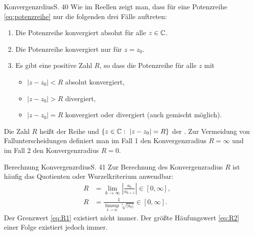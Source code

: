 \begin{bemerkung}{Konvergenzrdius}{S. 40}
  Wie im Reellen zeigt man, dass für eine Potenzreihe \eqref{eq:potenzreihe} nur die folgenden drei Fälle auftreten:
  \begin{enumerate}
    \item Die Potenzreihe konvergiert absolut für alle $z \in \mathbb{C}$.
    \item Die Potenzreihe konvergiert nur für $z = z_0$.
    \item Es gibt eine positive Zahl $R$, so dass die Potenzreihe für alle $z$ mit
      \begin{itemize}
        \item $|z - z_0| < R$ absolut konvergiert,
        \item $|z - z_0| > R$ divergiert,
        \item $|z - z_0| = R$ konvergiert oder divergiert (auch gemischt möglich).
      \end{itemize}
  \end{enumerate}
  Die Zahl $R$ heißt  der Reihe und $\{ z \in \mathbb{C} : \ |z - z_0| = R \}$ der .
  Zur Vermeidung von Fallunterscheidungen definiert man im Fall 1 den Konvergenzradius $R = \infty$ und im Fall 2 den Konvergenzradius $R = 0$.
\end{bemerkung}

\begin{bemerkung}{Berechnung Konvergenzrdius}{S. 41}
  Zur Berechnung des Konvergenzradius $R$ ist häufig das Quotienten oder Wurzelkriterium anwendbar:
  \begin{align}
    R &= \lim_{k \to \infty} \left| \frac{a_k}{a_{k+1}} \right| \in [0, \infty],\label{eq:R1}\\
    R &= \frac{1}{\displaystyle \limsup_{k \to \infty} \sqrt[k]{\left| a_k \right|}} \in [0, \infty].\label{eq:R2}
  \end{align}
  Der Grenzwert \eqref{eq:R1} existiert nicht immer.
  Der größte Häufungswert \eqref{eq:R2} einer Folge existiert jedoch immer.
\end{bemerkung}



